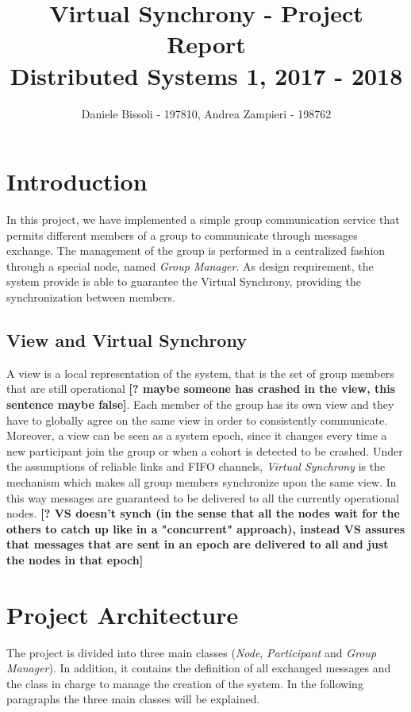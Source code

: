 \documentclass[11pt]{article}
\title{\LARGE{\textbf{Virtual Synchrony - Project Report}\\[0mm]\large{Distributed Systems 1, 2017 - 2018}}}
\author{Daniele Bissoli - 197810, Andrea Zampieri - 198762}
\date{}
\begin{document}
	\maketitle
	
	\section{Introduction}
	In this project, we have implemented a simple group communication service that permits different members of a group to communicate through messages exchange. The management of the group is performed in a centralized fashion through a special node, named \textit{Group Manager}. As design requirement, the system provide is able to guarantee the Virtual Synchrony, providing the synchronization between members.
	
	\subsection{View and Virtual Synchrony}
	A view is a local representation of the system, that is the set of group members that are still operational \textbf{[? maybe someone has crashed in the view, this sentence maybe false]}. Each member of the group has its own view and they have to globally agree on the same view in order to consistently communicate. Moreover, a view can be seen as a system epoch, since it changes every time a new participant join the group or when a cohort is detected to be crashed.
	Under the assumptions of reliable links and FIFO channels, \textit{Virtual Synchrony} is the mechanism which makes all group members synchronize upon the same view. In this way messages are guaranteed to be delivered to all the currently operational nodes. \textbf{[? VS doesn't synch (in the sense that all the nodes wait for the others to catch up like in a "concurrent" approach), instead VS assures that messages that are sent in an epoch are delivered to all and just the nodes in that epoch]}
	
	\section{Project Architecture}
	The project is divided into three main classes (\textit{Node}, \textit{Participant} and \textit{Group Manager}). In addition, it contains the definition of all exchanged messages and the class in charge to manage the creation of the system. In the following paragraphs the three main classes will be explained.
	
\end{document}
